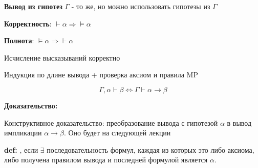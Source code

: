 \textbf{Вывод из гипотез} $\Gamma$ - то же, но можно использовать гипотезы из $\Gamma$


 \textbf{Корректность}: $\vdash\alpha \Rightarrow \models\alpha$

 \textbf{Полнота}: $\models\alpha \Rightarrow \vdash\alpha$



Исчисление высказываний корректно
\



Индукция по длине вывода + проверка аксиом и правила MP


$$\Gamma,\alpha\vdash\beta \Leftrightarrow \Gamma\vdash\alpha\rightarrow\beta$$

\textbf{Доказательство:}

Конструктивное доказательство: преобразование вывода с гипотезой $\alpha$ в вывод импликации $\alpha\rightarrow\beta$. Оно будет на следующей лекции

\textbf{def:} , если $\exists$ последовательность формул, каждая из которых это либо аксиома, либо получена правилом вывода и последней формулой является $\alpha$.
